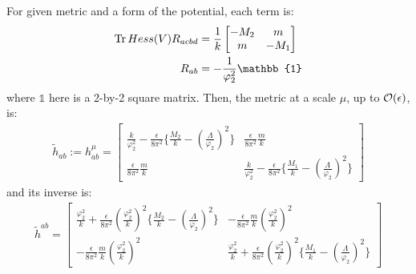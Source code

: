 For given metric and a form of the potential, each term is:
\begin{align}
    \Tr Hess(V) R_{acbd} &= \frac{1}{k} 
    \begin{bmatrix}
        -M_{2} & m \\
        m & -M_{1}
    \end{bmatrix} \\
    R_{ab} &= -\frac{1}{\varphi_{2} ^{2}} \mathbb{1}
\end{align}
where $\mathbb{1}$ here is a 2-by-2 square matrix. Then, the metric at a scale $\mu$, up to $\order{\epsilon}$, is:
\begin{align}
    \tilde h_{ab} := h_{ab} ^{\mu} = 
    \begin{bmatrix}
        \frac{k}{\varphi _{2} ^{2}} - \frac{\epsilon}{8\pi^{2}} \lbrace \frac{M_{2}}{k} - (\frac{\Lambda}{\varphi_{2}})^{2} \rbrace & \frac{\epsilon}{8\pi^{2}} \frac{m}{k} \\
        \frac{\epsilon}{8\pi^{2}} \frac{m}{k} & \frac{k}{\varphi _{2} ^{2}} - \frac{\epsilon}{8\pi^{2}} \lbrace \frac{M_{1}}{k} - (\frac{\Lambda}{\varphi_{2}})^{2} \rbrace
    \end{bmatrix}
\end{align}
and its inverse is:
\begin{align}
    \tilde h^{ab} = 
    \begin{bmatrix}
        \frac{\varphi_{2}^{2}}{k} + \frac{\epsilon}{8\pi^{2}}(\frac{\varphi_{2}^{2}}{k})^{2} \lbrace \frac{M_{2}}{k} - (\frac{\Lambda}{\varphi_{2}})^{2} \rbrace & -\frac{\epsilon}{8\pi^{2}} \frac{m}{k}(\frac{\varphi_{2}^{2}}{k})^{2} \\
        -\frac{\epsilon}{8\pi^{2}} \frac{m}{k}(\frac{\varphi_{2}^{2}}{k})^{2} & \frac{\varphi_{2}^{2}}{k} + \frac{\epsilon}{8\pi^{2}}(\frac{\varphi_{2}^{2}}{k})^{2} \lbrace \frac{M_{1}}{k} - (\frac{\Lambda}{\varphi_{2}})^{2} \rbrace
    \end{bmatrix}
\end{align}

